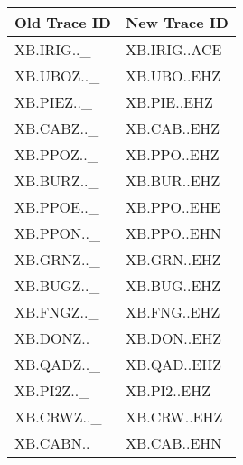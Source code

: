 \begin{tabular}{ll}
\toprule
Old Trace ID & New Trace ID \\
\midrule
XB.IRIG.._ & XB.IRIG..ACE \\
XB.UBOZ.._ & XB.UBO..EHZ \\
XB.PIEZ.._ & XB.PIE..EHZ \\
XB.CABZ.._ & XB.CAB..EHZ \\
XB.PPOZ.._ & XB.PPO..EHZ \\
XB.BURZ.._ & XB.BUR..EHZ \\
XB.PPOE.._ & XB.PPO..EHE \\
XB.PPON.._ & XB.PPO..EHN \\
XB.GRNZ.._ & XB.GRN..EHZ \\
XB.BUGZ.._ & XB.BUG..EHZ \\
XB.FNGZ.._ & XB.FNG..EHZ \\
XB.DONZ.._ & XB.DON..EHZ \\
XB.QADZ.._ & XB.QAD..EHZ \\
XB.PI2Z.._ & XB.PI2..EHZ \\
XB.CRWZ.._ & XB.CRW..EHZ \\
XB.CABN.._ & XB.CAB..EHN \\
\bottomrule
\end{tabular}
